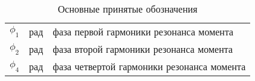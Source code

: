 \begin{table}[ht!]
\begin{tabular}{rll}
    $\phi_{1}$           & рад & фаза первой гармоники резонанса момента \\

    $\phi_{2}$           & рад & фаза второй гармоники резонанса момента \\

    $\phi_{4}$           & рад & фаза четвертой гармоники резонанса момента \\

    \end{tabular}
    \caption{ Основные принятые обозначения }
\end{table}
